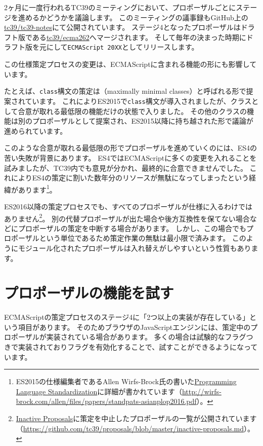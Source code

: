 2ヶ月に一度行われるTC39のミーティングにおいて、プロポーザルごとにステージを進めるかどうかを議論します。
このミーティングの議事録もGitHub上の\href{https://github.com/tc39/tc39-notes}{tc39/tc39-notes}にて公開されています。
ステージ4となったプロポーザルはドラフト版である\href{https://github.com/tc39/ecma262}{tc39/ecma262}へマージされます。
そして毎年の決まった時期にドラフト版を元にして\texttt{ECMAScript 20XX}としてリリースします。

この仕様策定プロセスの変更は、ECMAScriptに含まれる機能の形にも影響しています。

たとえば、\texttt{class}構文の策定は\textbf{}（maximally
minimal classes）と呼ばれる形で提案されています。
これによりES2015で\texttt{class}構文が導入されましたが、クラスとして合意が取れる最低限の機能だけの状態で入りました。
その他のクラスの機能は別のプロポーザルとして提案され、ES2015以降に持ち越された形で議論が進められています。

このような合意が取れる最低限の形でプロポーザルを進めていくのには、ES4の苦い失敗が背景にあります。
ES4ではECMAScriptに多くの変更を入れることを試みましたが、TC39内でも意見が分かれ、最終的に合意できませんでした。
これによりES4の策定に割いた数年分のリソースが無駄になってしまったという経緯があります\footnote{ES2015の仕様編集者であるAllen
  Wirfs-Brock氏の書いた\href{http://wirfs-brock.com/allen/files/papers/standpats-asianplop2016.pdf}{Programming
  Language Standardization}に詳細が書かれています（\url{http://wirfs-brock.com/allen/files/papers/standpats-asianplop2016.pdf}）。}。

ES2016以降の策定プロセスでも、すべてのプロポーザルが仕様に入るわけではありません\footnote{\href{https://github.com/tc39/proposals/blob/master/inactive-proposals.md}{Inactive
  Proposals}に策定を中止したプロポーザルの一覧が公開されています（\url{https://github.com/tc39/proposals/blob/master/inactive-proposals.md}）。}。
別の代替プロポーザルが出た場合や後方互換性を保てない場合などにプロポーザルの策定を中断する場合があります。
しかし、この場合でもプロポーザルという単位であるため策定作業の無駄は最小限で済みます。
このようにモジュール化されたプロポーザルは入れ替えがしやすいという性質もあります。

\hypertarget{try-proposal}{%
\section{プロポーザルの機能を試す}\label{try-proposal}}

ECMAScriptの策定プロセスのステージ4に「2つ以上の実装が存在している」という項目があります。
そのためブラウザのJavaScriptエンジンには、策定中のプロポーザルが実装されている場合があります。
多くの場合は試験的なフラグつきで実装されておりフラグを有効化することで、試すことができるようになっています。

